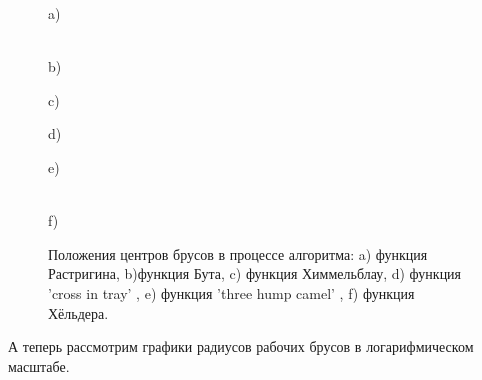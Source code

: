 \documentclass[a4paper]{article}
\begin{document}
\begin{figure}[H]
\begin{minipage}[h]{0.5\linewidth}
 a) \\
\end{minipage}
\hfill
\begin{minipage}[h]{0.5\linewidth}
 \\b)
\end{minipage}
\vfill
\begin{minipage}[h]{0.5\linewidth}
 c) \\
\end{minipage}
\hfill
\begin{minipage}[h]{0.5\linewidth}
 d) \\
\end{minipage}
\vfill
\begin{minipage}[h]{0.5\linewidth}
 e) \\
\end{minipage}
\hfill
\begin{minipage}[h]{0.5\linewidth}
 \\f)
\end{minipage}
\caption{Положения центров брусов в процессе алгоритма: a) функция Растригина, b)функция Бута, c) функция Химмельблау, d) функция 'cross in tray' , e) функция 'three hump camel' , f)  функция Хёльдера.}
\label{ris:center_blocks}
\end{figure}
\newpage
А теперь рассмотрим графики радиусов рабочих брусов в логарифмическом масштабе.
\end{document}

